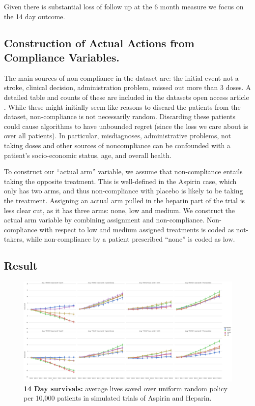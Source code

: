 Given there is substantial loss of follow up at the 6 month measure we focus on the 14 day outcome.


\subsection{Construction of Actual Actions from Compliance Variables.}
The main sources of non-compliance in the dataset are: the initial event not a stroke, clinical decision, administration problem, missed out more than 3 doses. A detailed table and counts of these are included in the datasets open access article \cite{ist:11}. 
While these might initially seem like reasons to discard the patients from the dataset, non-compliance is not necessarily random. Discarding these patients could cause algorithms to have unbounded regret (since the loss we care about is over all patients). In particular, misdiagnoses, administrative problems, not taking doses and other sources of noncompliance can be confounded with a patient's socio-economic status, age, and overall health. 

To construct our ``actual arm'' variable, we assume that non-compliance entails taking the opposite treatment.
This is well-defined in the Aspirin case, which only has two arms, and thus non-compliance with placebo is likely to be taking the treatment.
Assigning an actual arm pulled in the heparin part of the trial is less clear cut, as it has three arms: none, low and medium. We construct the actual arm variable by combining assignment and non-compliance. Non-compliance with respect to low and medium assigned treatments is coded as  not-takers, while non-compliance by a patient prescribed ``none'' is coded as low.


\subsection{Result}

\begin{figure}
\begin{center}
\centerline{\includegraphics[width=1\textwidth, angle=90]{bandit/figs/fig1.png}}
\caption{\textbf{14 Day survivals:} average lives saved over uniform random policy per 10,000 patients in simulated trials of Aspirin and Heparin.}
\label{fig1}
\end{center}
\end{figure} 

